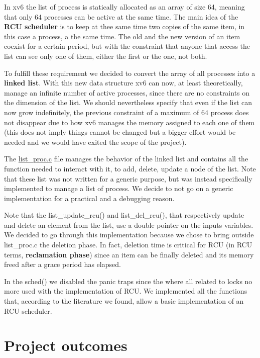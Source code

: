 \documentclass[10pt,a4]{article}
\begin{document}
In xv6 the list of process is statically allocated as an array of size 64, meaning that only 64 processes can be active at the same time. 
The main idea of the \textbf{RCU scheduler} is to keep at thee same time two copies of the same item, in this case a process, a the same time. 
The old and the new version of an item coexist for a certain period, but with the constraint that anyone that access the list can see only 
one of them, either the first or the one, not both. 

To fulfill these requirement we decided to convert the array of all processes into a \textbf{linked list}. 
With this new data structure xv6 can now, at least theoretically, manage an infinite number of active processes, 
since there are no constraints on the dimension of the list. 
We should nevertheless specify that even if the list can now grow indefinitely, 
the previous constraint of a maximum of 64 process does not disappear due to how xv6 manages the memory  assigned to each one of them 
(this does not imply things cannot be changed but a bigger effort would be needed and we would have exited the scope of the project).

The \href{https://github.com/salvoM/xv6-riscv-rcu/blob/definitive/kernel/list_proc.c}{list\_proc.c} 
file manages the behavior of the linked list and contains all the function needed to interact with it, 
to add, delete, update a node of the list. Note that these list was not written for a  generic purpose, 
but was instead specifically implemented to manage a list of process. 
We decide to not go on a generic implementation for a practical and a debugging reason.

Note that the list\_update\_rcu() and list\_del\_rcu(), that respectively update and delete an element from the list, 
use a double pointer on the inputs variables. 
We decided to go through this implementation because we chose to bring outside list\_proc.c the deletion phase. 
In fact, deletion time is critical for RCU (in RCU terms, \textbf{reclamation phase}) since an item can be finally deleted 
and its memory freed after a grace period has elapsed. 

In the sched() we disabled the panic traps since the where all related to locks no more used with the implementation of RCU. 
We implemented all the functions that, according to the literature we found, allow a basic implementation of an RCU scheduler.

\pagebreak
\section{Project outcomes}
\end{document}
